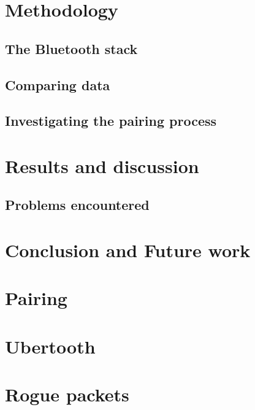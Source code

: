 \documentclass{article}
\begin{document}
\section{Methodology}		%
 
	\subsection{The Bluetooth stack}
				
		
	\subsection{Comparing data}	%
		
	
	\subsection{Investigating the pairing process}
		
\newpage
\section{Results and discussion}

		
		\subsection{Problems encountered}
		
\newpage
\section{Conclusion and Future work}


\newpage

\vspace*{2\baselineskip} %


{}


\appendix
\section{Pairing}
\label{app:pairing}
\section{Ubertooth}
\label{app:ubertooth}
\section{Rogue packets}
\label{app:roguepackets}

\end{document}
